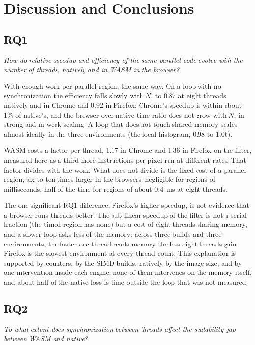\section{Discussion and Conclusions}
\label{sec:discussion}

\subsection{RQ1}

\emph{How do relative speedup and efficiency of the same parallel code
evolve with the number of threads, natively and in WASM in the browser?}

With enough work per parallel region, the same way. On a loop with no
synchronization the efficiency falls slowly with $N$, to 0.87 at eight
threads natively and in Chrome and 0.92 in Firefox; Chrome's speedup is
within about 1\% of native's, and the browser over native time ratio does
not grow with $N$, in strong and in weak scaling. A loop that does not
touch shared memory scales almost ideally in the three environments (the
local histogram, 0.98 to 1.06).

WASM costs a factor per thread, 1.17 in Chrome and 1.36 in Firefox
on the filter, measured here as a third more instructions per pixel run at
different rates. That factor divides with the work. What does not divide is
the fixed cost of a parallel region, six to ten times larger in the
browsers: negligible for regions of milliseconds, half of the time for
regions of about 0.4~ms at eight threads.

The one significant RQ1 difference, Firefox's higher speedup, is not
evidence that a browser runs threads better. The sub-linear speedup of the
filter is not a serial fraction (the timed region has none) but a cost of
eight threads sharing memory, and a slower loop asks less of the memory:
across three builds and three environments, the faster one thread reads
memory the less eight threads gain. Firefox is the slowest environment at
every thread count. This explanation is supported by counters, by the SIMD
builds, natively by the image size, and by one intervention inside each
engine; none of them intervenes on the memory itself, and about half of the
native loss is time outside the loop that was not measured.

\subsection{RQ2}

\emph{To what extent does synchronization between threads affect the
scalability gap between WASM and native?}

